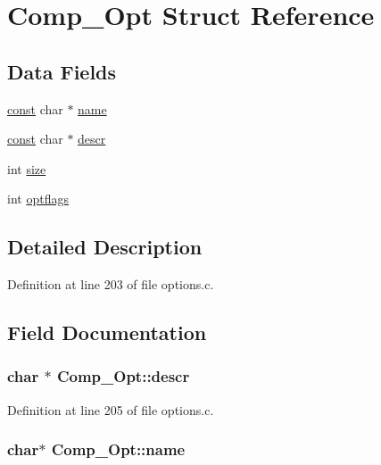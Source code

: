 \hypertarget{structComp__Opt}{\section{Comp\+\_\+\+Opt Struct Reference}
\label{structComp__Opt}
}
\subsection*{Data Fields}
\begin{DoxyCompactItemize}
\item 
\hyperlink{tradstdc_8h_a2c212835823e3c54a8ab6d95c652660e}{const} char $\ast$ \hyperlink{structComp__Opt_a7778721871492793fb2c29a2bdae95db}{name}
\item 
\hyperlink{tradstdc_8h_a2c212835823e3c54a8ab6d95c652660e}{const} char $\ast$ \hyperlink{structComp__Opt_a9fce67c084b5ed4f3ee13689854142c4}{descr}
\item 
int \hyperlink{structComp__Opt_af56359b81acbde92474bb8d1bb290acd}{size}
\item 
int \hyperlink{structComp__Opt_a37f680c03f08f1190c7cf67ad8e1232c}{optflags}
\end{DoxyCompactItemize}


\subsection{Detailed Description}


Definition at line 203 of file options.\+c.



\subsection{Field Documentation}
\hypertarget{structComp__Opt_a9fce67c084b5ed4f3ee13689854142c4}{
\subsubsection[{descr}]{ char $\ast$ Comp\+\_\+\+Opt\+::descr}}\label{structComp__Opt_a9fce67c084b5ed4f3ee13689854142c4}


Definition at line 205 of file options.\+c.

\hypertarget{structComp__Opt_a7778721871492793fb2c29a2bdae95db}{
\subsubsection[{name}]{ char$\ast$ Comp\+\_\+\+Opt\+::name}}\label{structComp__Opt_a7778721871492793fb2c29a2bdae95db}


